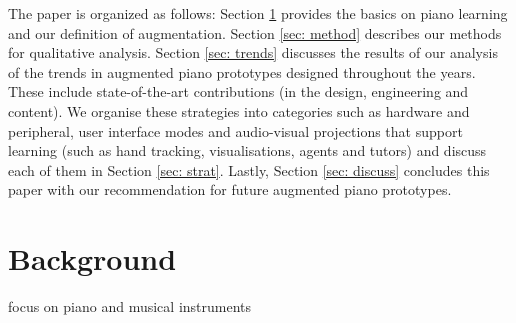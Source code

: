 \documentclass[sigchi, review]{acmart}
\begin{document}
The paper is organized as follows: Section \ref{sec: bg} provides the basics on piano learning and our definition of augmentation. Section \ref{sec: method} describes our methods for qualitative analysis. Section \ref{sec: trends} discusses the results of our analysis of the trends in augmented piano prototypes designed throughout the years. These include state-of-the-art contributions (in the design, engineering and content). We organise these strategies into categories such as hardware and peripheral, user interface modes and audio-visual projections that support learning (such as hand tracking, visualisations, agents and tutors) and discuss each of them in Section \ref{sec: strat}. Lastly, Section \ref{sec: discuss} concludes this paper with our recommendation for future augmented piano prototypes. 



\section{Background}
\label{sec: bg}
 focus on piano and musical instruments 
\end{document}
